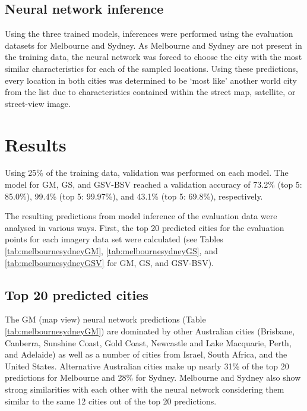 \documentclass[Crown,sageh,times]{sagej}
\begin{document}
\subsection{Neural network inference}\label{sec:methods5}    
Using the three trained models, inferences were performed using the evaluation datasets for Melbourne and Sydney. As Melbourne and Sydney are not present in the training data, the neural network was forced to choose the city with the most similar characteristics for each of the sampled locations. Using these predictions, every location in both cities was determined to be `most like' another world city from the list due to  characteristics contained within the street map, satellite, or street-view image.



\section{Results}\label{sec:results}

Using 25\% of the training data, validation was performed on each model. The model for GM, GS, and GSV-BSV reached a validation accuracy of 73.2\% (top 5: 85.0\%), 99.4\% (top 5: 99.97\%), and 43.1\% (top 5: 69.8\%), respectively.

The resulting predictions from model inference of the evaluation data were analysed in various ways. First, the top 20 predicted cities for the evaluation points for each imagery data set were calculated (see Tables \ref{tab:melbournesydneyGM}, \ref{tab:melbournesydneyGS}, and \ref{tab:melbournesydneyGSV} for GM, GS, and GSV-BSV).

\subsection{Top 20 predicted cities} 

The GM (map view) neural network predictions (Table \ref{tab:melbournesydneyGM}) are dominated by other Australian cities (Brisbane, Canberra, Sunshine Coast, Gold Coast, Newcastle and Lake Macquarie, Perth, and Adelaide) as well as a number of cities from Israel, South Africa, and the United States. Alternative Australian cities make up nearly 31\% of the top 20 predictions for Melbourne and 28\% for Sydney. Melbourne and Sydney also show strong similarities with each other with the neural network considering them similar to the same 12 cities out of the top 20 predictions.
\end{document}
